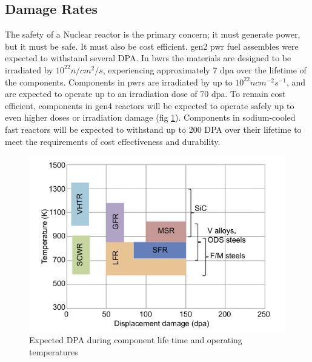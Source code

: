 \subsection{Damage Rates}
\FloatBarrier

The safety of a Nuclear reactor is the primary concern; it must generate power, but it must be safe.  It must also be cost efficient.  \acrshort{gen2} \acrshort{pwr} fuel assembles were expected to withstand several DPA\cite{genIVstrucmat}.  In \acrshort{bwr}s the materials are designed to be irradiated by $10^{22} n/cm^2/s$, experiencing approximately 7 \acrshort{dpa} over the lifetime of the components\cite{lightwaterallenbusby}.  Components in \acrshort{pwr}s are irradiated by up to $10^{22} n cm^{-2} s^{-1}$, and are expected to operate up to an irradiation dose of 70 dpa\cite{lightwaterallenbusby}.  To remain cost efficient, components in \acrshort{gen4} reactors will be expected to operate safely up to even higher doses or irradiation damage (fig \ref{fig:genIVdpa}).  Components in sodium-cooled fast reactors will be expected to withstand up to 200 DPA over their lifetime to meet the requirements of cost effectiveness and durability\cite{genIVstrucmat}.


\begin{figure}[h]
  \begin{center}
    \includegraphics[scale=0.55]{chapters/background_austenitic_steels_in_nuclear/images/dpagenIV.png}
    \caption{Expected DPA during component life time and operating temperatures\cite{genIVstrucmat}}
    \label{fig:genIVdpa}
  \end{center}
\end{figure}
\FloatBarrier

